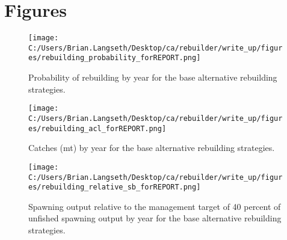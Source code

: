 \documentclass[11pt,
  english,
  a4paper,
]{article}
\begin{document}
\clearpage


\hypertarget{figures}{%
\section{Figures}\label{figures}}

\leavevmode\tagmcend\tagstructend


\begin{figure}
\centering
\texttt{[image: C:/Users/Brian.Langseth/Desktop/ca/rebuilder/write\_up/figures/rebuilding\_probability\_forREPORT.png]}
\caption{Probability of rebuilding by year for the base alternative rebuilding strategies.\label{fig:prob-fig}}
\end{figure}

\tagmcend\tagstructend


\begin{figure}
\centering
\texttt{[image: C:/Users/Brian.Langseth/Desktop/ca/rebuilder/write\_up/figures/rebuilding\_acl\_forREPORT.png]}
\caption{Catches (mt) by year for the base alternative rebuilding strategies.\label{fig:acl-fig}}
\end{figure}

\tagmcend\tagstructend


\begin{figure}
\centering
\texttt{[image: C:/Users/Brian.Langseth/Desktop/ca/rebuilder/write\_up/figures/rebuilding\_relative\_sb\_forREPORT.png]}
\caption{Spawning output relative to the management target of 40 percent of unfished spawning output by year for the base alternative rebuilding strategies.\label{fig:rel-ssb-fig}}
\end{figure}

\tagmcend\tagstructend

\end{document}
